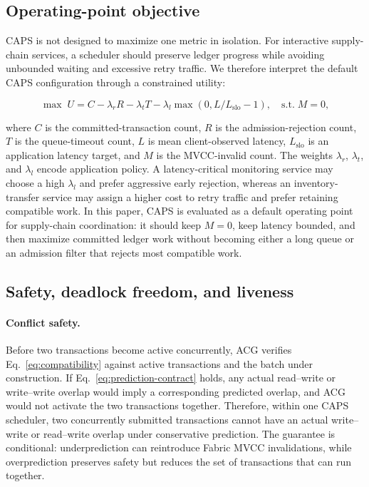 \documentclass[fleqn,10pt,lineno]{wlpeerj}
\begin{document}
\subsection*{Operating-point objective}

CAPS is not designed to maximize one metric in isolation. For interactive supply-chain services, a scheduler should preserve ledger progress while avoiding unbounded waiting and excessive retry traffic. We therefore interpret the default CAPS configuration through a constrained utility:

\begin{equation}
\max \; U
= C
- \lambda_r R
- \lambda_t T
- \lambda_l \max(0,L/L_{\mathrm{slo}}-1),
\quad
\mathrm{s.t.}\; M=0,
\label{eq:operating-objective}
\end{equation}

where $C$ is the committed-transaction count, $R$ is the admission-rejection count, $T$ is the queue-timeout count, $L$ is mean client-observed latency, $L_{\mathrm{slo}}$ is an application latency target, and $M$ is the MVCC-invalid count. The weights $\lambda_r$, $\lambda_t$, and $\lambda_l$ encode application policy. A latency-critical monitoring service may choose a high $\lambda_l$ and prefer aggressive early rejection, whereas an inventory-transfer service may assign a higher cost to retry traffic and prefer retaining compatible work. In this paper, CAPS is evaluated as a default operating point for supply-chain coordination: it should keep $M=0$, keep latency bounded, and then maximize committed ledger work without becoming either a long queue or an admission filter that rejects most compatible work.

\subsection*{Safety, deadlock freedom, and liveness}

\paragraph{Conflict safety.}
Before two transactions become active concurrently, ACG verifies Eq.~\eqref{eq:compatibility} against active transactions and the batch under construction. If Eq.~\eqref{eq:prediction-contract} holds, any actual read--write or write--write overlap would imply a corresponding predicted overlap, and ACG would not activate the two transactions together. Therefore, within one CAPS scheduler, two concurrently submitted transactions cannot have an actual write--write or read--write overlap under conservative prediction. The guarantee is conditional: underprediction can reintroduce Fabric MVCC invalidations, while overprediction preserves safety but reduces the set of transactions that can run together.
\end{document}
